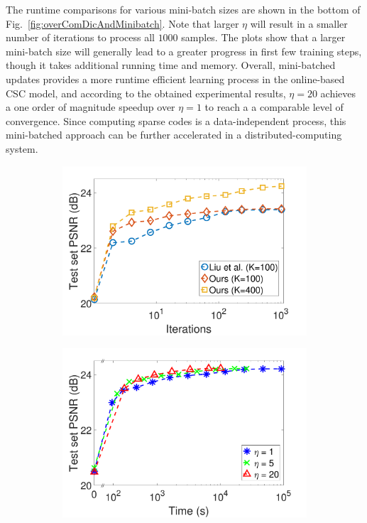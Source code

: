 The runtime comparisons for various mini-batch sizes are shown in the
bottom of Fig.~\ref{fig:overComDicAndMinibatch}. Note that larger
$\eta$ will result in a smaller number of iterations to process all
$1000$ samples. The plots show that a larger mini-batch size will
generally lead to a greater progress in first few training steps,
though it takes additional running time and memory. Overall,
mini-batched updates provides a more runtime efficient learning
process in the online-based CSC model, and according to the obtained
experimental results, $\eta=20$ achieves a one order of magnitude
speedup over $\eta=1$ to reach a a comparable level of
convergence. Since computing sparse codes is a data-independent
process, this mini-batched approach can be further accelerated in a
distributed-computing system.
\begin{figure}[h]
\centering
\begin{subfigure}{0.5\textwidth}
  \includegraphics[width=1\linewidth]{figure/overComplete-ite.pdf}
\end{subfigure}
\begin{subfigure}{0.5\textwidth}
  \includegraphics[width=1\linewidth]{figure/minibatch.pdf}
\end{subfigure}


\end{figure}
